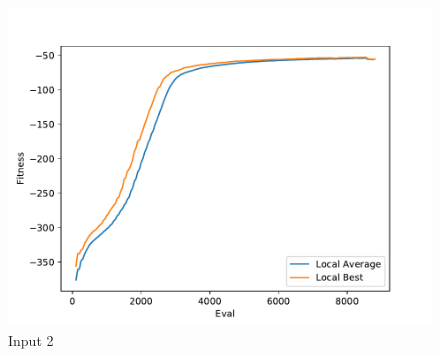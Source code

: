 \documentclass{standalone}
\begin{document}
\begin{figure}[!htb]
	\caption{Input 2}
	\label{fig:graph_2040}
	\includegraphics[width=\textwidth]{../graphs/graphs/2040.pdf}
\end{figure}
\end{document}
